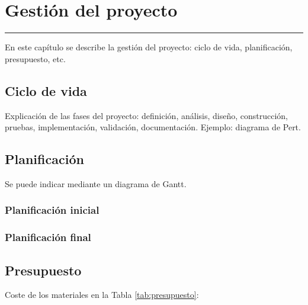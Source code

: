 \chapter{Gestión del proyecto} \label{chap:Gestion}
\hrule
\vspace{3mm}

En este capítulo se describe la gestión del proyecto: ciclo de vida, planificación, presupuesto, etc.

\section{Ciclo de vida}

Explicación de las fases del proyecto: definición, análisis, diseño, construcción, pruebas, implementación, validación, documentación. Ejemplo: diagrama de Pert.

\section{Planificación}

Se puede indicar mediante un diagrama de Gantt.

\subsection{Planificación inicial}

\subsection{Planificación final}


\section{Presupuesto}

    Coste de los materiales en la Tabla \ref{tab:presupuesto}:

    \completar

    \renewcommand{\thempfootnote}{\arabic{mpfootnote}}

